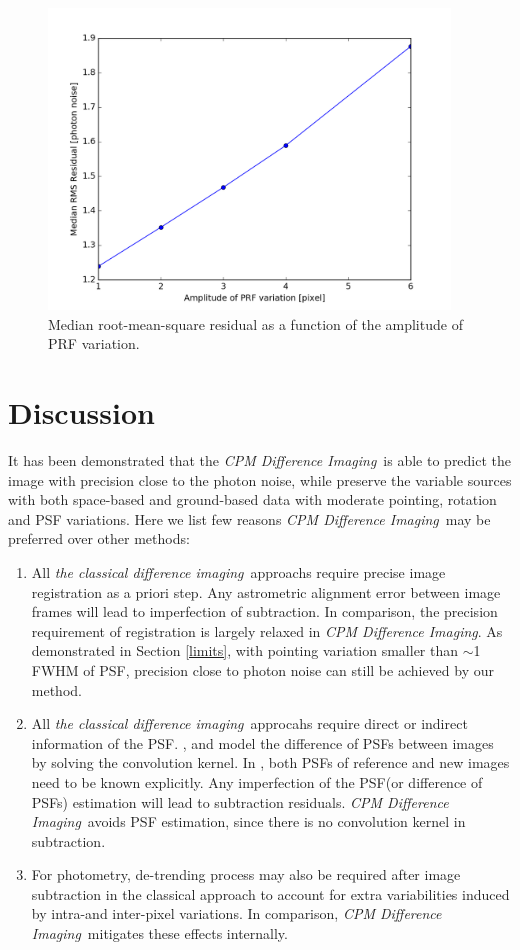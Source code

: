 \documentclass[12pt, preprint]{aastex}
\newcommand{\project}[1]{\textsl{#1}}
\newcommand{\cpmdiff}{\project{CPM Difference Imaging}}
\newcommand{\class}{\project{the classical difference imaging}}
\begin{document}
\begin{figure}[p]
\begin{center}
\includegraphics[width=0.95\textwidth]{prf_p}
\end{center}
\caption{
\label{prf_rms}
 Median root-mean-square residual as a function of the amplitude of PRF variation.
}
\end{figure}

\section{Discussion}
It has been demonstrated that the \cpmdiff\ is able to predict the image with precision close to the photon noise, while preserve the variable sources with both space-based and ground-based data with moderate pointing, rotation and PSF variations. 
Here we list few reasons \cpmdiff\ may be preferred over other methods:

\begin{enumerate}
\item All \class\ approachs require precise image registration as a priori step. 
Any astrometric alignment error between image frames will lead to imperfection of subtraction.
In comparison, the precision requirement of registration is largely relaxed in \cpmdiff. 
As demonstrated in Section \ref{limits}, with pointing variation smaller than $\sim$1 FWHM of PSF, precision close to photon noise can still be achieved by our method.  

\item All \class\ approcahs require direct or indirect information of the PSF. 
\cite{imagesub1}, \cite{alard} and \cite{bramich} model the difference of PSFs between images by solving the convolution kernel.
In \cite{optimal}, both PSFs of reference and new images need to be known explicitly.
Any imperfection of the PSF(or difference of PSFs) estimation will lead to subtraction residuals.
\cpmdiff\ avoids PSF estimation, since there is no convolution kernel in subtraction.

\item For photometry, de-trending process may also be required after image subtraction in the classical approach to account for extra variabilities induced by intra-and inter-pixel variations.
In comparison, \cpmdiff\ mitigates these effects internally.
\end{enumerate}
\end{document}
